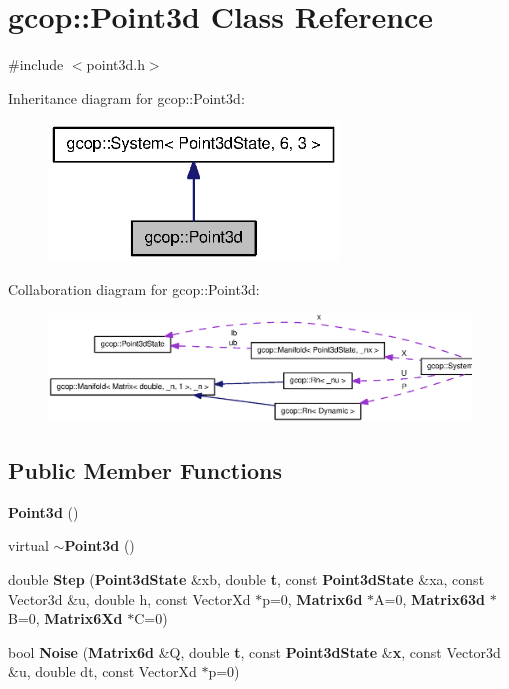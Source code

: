 \section{gcop\-:\-:\-Point3d \-Class \-Reference}
\label{classgcop_1_1Point3d}


{\ttfamily \#include $<$point3d.\-h$>$}



\-Inheritance diagram for gcop\-:\-:\-Point3d\-:\nopagebreak
\begin{figure}[H]
\begin{center}
\leavevmode
\includegraphics[width=218pt]{classgcop_1_1Point3d__inherit__graph}
\end{center}
\end{figure}


\-Collaboration diagram for gcop\-:\-:\-Point3d\-:\nopagebreak
\begin{figure}[H]
\begin{center}
\leavevmode
\includegraphics[width=350pt]{classgcop_1_1Point3d__coll__graph}
\end{center}
\end{figure}
\subsection*{\-Public \-Member \-Functions}
\begin{DoxyCompactItemize}
\item 
{\bf \-Point3d} ()
\item 
virtual {\bf $\sim$\-Point3d} ()
\item 
double {\bf \-Step} ({\bf \-Point3d\-State} \&xb, double {\bf t}, const {\bf \-Point3d\-State} \&xa, const \-Vector3d \&u, double h, const \-Vector\-Xd $\ast$p=0, {\bf \-Matrix6d} $\ast$\-A=0, {\bf \-Matrix63d} $\ast$\-B=0, {\bf \-Matrix6\-Xd} $\ast$\-C=0)
\item 
bool {\bf \-Noise} ({\bf \-Matrix6d} \&\-Q, double {\bf t}, const {\bf \-Point3d\-State} \&{\bf x}, const \-Vector3d \&u, double dt, const \-Vector\-Xd $\ast$p=0)
\end{DoxyCompactItemize}
